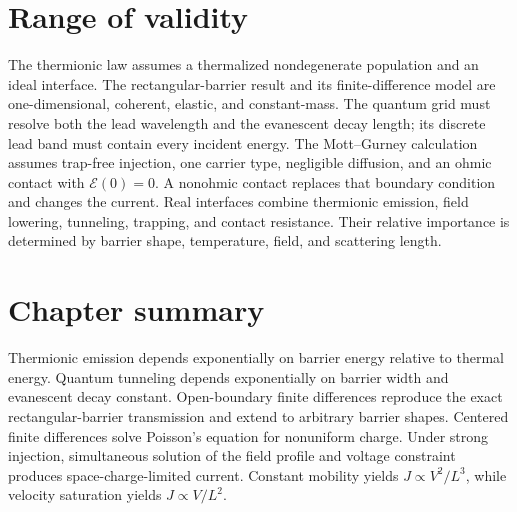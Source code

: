 \section{Range of validity}

The thermionic law assumes a thermalized nondegenerate population and an ideal
interface.  The rectangular-barrier result and its finite-difference model are
one-dimensional, coherent, elastic, and constant-mass.  The quantum grid must
resolve both the lead wavelength and the evanescent decay length; its discrete
lead band must contain every incident energy.  The Mott--Gurney calculation
assumes trap-free injection, one carrier type, negligible diffusion, and an
ohmic contact with $\mathcal E(0)=0$.  A nonohmic contact replaces that boundary
condition and changes the current.  Real interfaces combine thermionic
emission, field lowering, tunneling, trapping, and contact resistance.  Their
relative importance is determined by barrier shape, temperature, field, and
scattering length.

\section{Chapter summary}

Thermionic emission depends exponentially on barrier energy relative to
thermal energy.  Quantum tunneling depends exponentially on barrier width and
evanescent decay constant.  Open-boundary finite differences reproduce the
exact rectangular-barrier transmission and extend to arbitrary barrier shapes.
Centered finite differences solve Poisson's equation for nonuniform charge.
Under strong injection, simultaneous solution of the field profile and voltage
constraint produces space-charge-limited current.  Constant mobility yields
$J\propto V^2/L^3$, while velocity saturation yields $J\propto V/L^2$.
